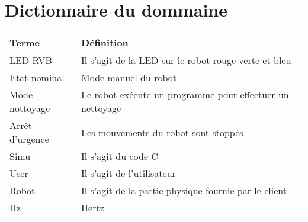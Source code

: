 \section{Dictionnaire du dommaine}

\begin{tabularx}{\textwidth}{|X|X|}
    \hline
    \textbf{Terme} & \textbf{Définition} \\
    \hline
    LED RVB & Il s'agit de la LED sur le robot rouge verte et bleu \\
    \hline
    Etat nominal & Mode manuel du robot  \\
    \hline
    Mode nottoyage & Le robot exécute un programme pour effectuer un nettoyage \\
    \hline
    Arrêt d'urgence & Les mouvements du robot sont stoppés \\
    \hline
    Simu & Il s'agit du code C \\
    \hline
    User & Il s'agit de l'utilisateur \\
    \hline
    Robot & Il s'agit de la partie physique fournie par le client \\
    \hline
    Hz & Hertz \\
    \hline
\end{tabularx}